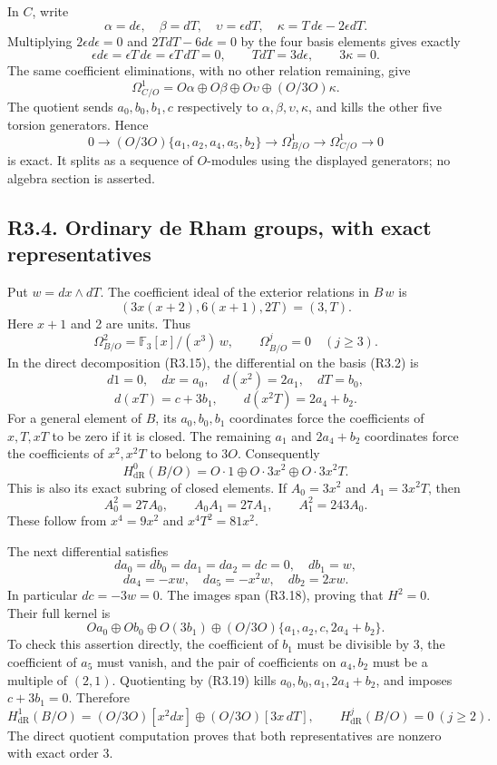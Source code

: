 \documentclass[
]{article}
\begin{document}
In \(C\), write \[
\alpha=d\epsilon,\quad \beta=dT,\quad
\upsilon=\epsilon dT,\quad
\kappa=T\,d\epsilon-2\epsilon dT.
\] Multiplying \(2\epsilon d\epsilon=0\) and \(2TdT-6d\epsilon=0\) by
the four basis elements gives exactly \[
\epsilon d\epsilon=\epsilon T\,d\epsilon=\epsilon T\,dT=0,\qquad
TdT=3d\epsilon,\qquad3\kappa=0.
\] The same coefficient eliminations, with no other relation remaining,
give \[
\Omega^1_{C/O}
=O\alpha\oplus O\beta\oplus O\upsilon\oplus(O/3O)\kappa.
\tag{R3.16}
\] The quotient sends \(a_0,b_0,b_1,c\) respectively to
\(\alpha,\beta,\upsilon,\kappa\), and kills the other five torsion
generators. Hence \[
0\longrightarrow(O/3O)\{a_1,a_2,a_4,a_5,b_2\}
\longrightarrow\Omega^1_{B/O}
\longrightarrow\Omega^1_{C/O}
\longrightarrow0
\tag{R3.17}
\] is exact. It splits as a sequence of \(O\)-modules using the
displayed generators; no algebra section is asserted.

\subsection{R3.4. Ordinary de Rham groups, with exact
representatives}\label{r3.4.-ordinary-de-rham-groups-with-exact-representatives}

Put \(w=dx\wedge dT\). The coefficient ideal of the exterior relations
in \(B\,w\) is \[
(3x(x+2),6(x+1),2T)=(3,T).
\] Here \(x+1\) and 2 are units. Thus \[
\Omega^2_{B/O}=\mathbb F_3[x]/(x^3)\,w,\qquad
\Omega^j_{B/O}=0\quad(j\ge3).
\tag{R3.18}
\] In the direct decomposition (R3.15), the differential on the basis
(R3.2) is \[
d1=0,\quad dx=a_0,\quad d(x^2)=2a_1,\quad dT=b_0,
\] \[
d(xT)=c+3b_1,\qquad d(x^2T)=2a_4+b_2.
\tag{R3.19}
\] For a general element of \(B\), its \(a_0,b_0,b_1\) coordinates force
the coefficients of \(x,T,xT\) to be zero if it is closed. The remaining
\(a_1\) and \(2a_4+b_2\) coordinates force the coefficients of
\(x^2,x^2T\) to belong to \(3O\). Consequently \[
H^0_{\mathrm{dR}}(B/O)
=O\cdot1\oplus O\cdot3x^2\oplus O\cdot3x^2T.
\tag{R3.20}
\] This is also its exact subring of closed elements. If \(A_0=3x^2\)
and \(A_1=3x^2T\), then \[
A_0^2=27A_0,\qquad A_0A_1=27A_1,\qquad A_1^2=243A_0.
\] These follow from \(x^4=9x^2\) and \(x^4T^2=81x^2\).

The next differential satisfies \[
da_0=db_0=da_1=da_2=dc=0,\quad db_1=w,
\] \[
da_4=-xw,\quad da_5=-x^2w,\quad db_2=2xw.
\tag{R3.21}
\] In particular \(dc=-3w=0\). The images span (R3.18), proving that
\(H^2=0\). Their full kernel is \[
Oa_0\oplus Ob_0\oplus O(3b_1)
\oplus(O/3O)\{a_1,a_2,c,2a_4+b_2\}.
\] To check this assertion directly, the coefficient of \(b_1\) must be
divisible by 3, the coefficient of \(a_5\) must vanish, and the pair of
coefficients on \(a_4,b_2\) must be a multiple of \((2,1)\). Quotienting
by (R3.19) kills \(a_0,b_0,a_1,2a_4+b_2\), and imposes \(c+3b_1=0\).
Therefore \[
H^1_{\mathrm{dR}}(B/O)
=(O/3O)[x^2dx]\oplus(O/3O)[3x\,dT],
\qquad H^j_{\mathrm{dR}}(B/O)=0\ (j\ge2).
\tag{R3.22}
\] The direct quotient computation proves that both representatives are
nonzero with exact order 3.
\end{document}

